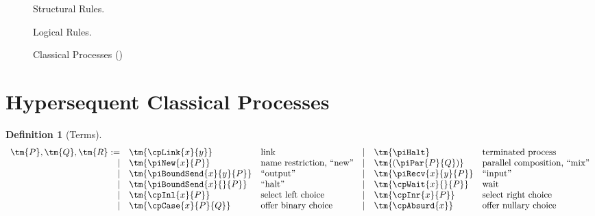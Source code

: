 \documentclass[submission,copyright,creativecommons]{eptcs}
\newtheorem{definition}{Definition}
\begin{document}
\begin{figure*}[!htb]
  Structural Rules.
  \begin{center} \cpInfAx     \cpInfCut      \end{center}

  Logical Rules.
  \begin{center} \cpInfTens   \cpInfParr     \end{center}
  \begin{center} \cpInfOne    \cpInfBot      \end{center}
  \begin{center}       \end{center}
  \begin{center} \cpInfWith                  \end{center}
  \begin{center} \cpInfNil    \cpInfTop      \end{center}

  \caption{Classical Processes (\cp)}
  \label{fig:cp}
\end{figure*}


\section{Hypersequent Classical Processes}

\begin{definition}[Terms]\label{def:hcp-terms}
  \begin{gather*}
    \begin{array}{rllrll}
      \tm{P}, \tm{Q}, \tm{R}
           :=& \tm{\cpLink{x}{y}}         &\text{link}
      &  \mid& \tm{\piHalt}               &\text{terminated process}
      \\ \mid& \tm{\piNew{x}{P}}          &\text{name restriction, ``new''}
      &  \mid& \tm{( \piPar{P}{Q} )}      &\text{parallel composition, ``mix''}
      \\ \mid& \tm{\piBoundSend{x}{y}{P}} &\text{``output''}
      &  \mid& \tm{\piRecv{x}{y}{P}}      &\text{``input''}
      \\ \mid& \tm{\piBoundSend{x}{}{P}}  &\text{``halt''}
      &  \mid& \tm{\cpWait{x}{}{P}}       &\text{wait}
      \\ \mid& \tm{\cpInl{x}{P}}          &\text{select left choice}
      &  \mid& \tm{\cpInr{x}{P}}          &\text{select right choice}
      \\ \mid& \tm{\cpCase{x}{P}{Q}}      &\text{offer binary choice}
      &  \mid& \tm{\cpAbsurd{x}}          &\text{offer nullary choice}
    \end{array}
  \end{gather*}
\end{definition}
\end{document}
